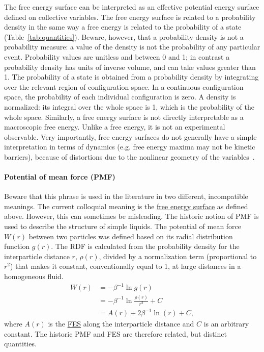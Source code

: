 \documentclass[9pt,review]{livecoms}
\begin{document}
The free energy surface can be interpreted as an effective potential energy surface defined on collective variables.
The free energy surface is related to a probability density in the same way a free energy is related to the probability of a state (Table~\ref{tab:quantities}).
Beware, however, that a probability density is not a probability measure: a value of the density is not the probability of any particular event.
Probability values are unitless and between 0 and 1; in contrast a probability density has units of inverse volume, and can take values greater than 1. The probability of a state is obtained from a probability density by integrating over the relevant region of configuration space. In a continuous configuration space, the probability of each individual configuration is zero.
A density is normalized: its integral over the whole space is 1, which is the probability of the whole space.
Similarly, a free energy surface is not directly interpretable as a macroscopic free energy. Unlike a free energy, it is not an experimental observable.
Very importantly, free energy surfaces do not generally have a simple interpretation in terms of dynamics (e.g. free energy maxima may not be kinetic barriers), because of distortions due to the nonlinear geometry of the variables~\cite{10.1063/5.0020240,Dietschreit2022}.


\hypertarget{ref:PMF} {\paragraph{Potential of mean force (PMF)}}
Beware that this phrase is used in the literature in two different, incompatible meanings. The current colloquial meaning is the \hyperlink{ref:FES} {free energy surface} as defined above.  However, this can sometimes be misleading. The historic notion of PMF is used to describe the structure of simple liquids.
The potential of mean force $W(r)$ between two particles was defined based on its radial distribution function $g(r)$. The RDF is calculated from the probability density for the interparticle distance $r$, $\rho(r)$, divided by a normalization term (proportional to $r^2$) that makes it constant, conventionally equal to 1, at large distances in a homogeneous fluid.
\begin{align}
    W(r) &= -\beta^{-1} \ln g(r) \nonumber \\
    &= -\beta^{-1} \ln \frac{\rho(r)}{r^2} + C  \nonumber \\
    &= A(r) + 2 \beta^{-1} \ln(r) + C,
    \label{eq:pmf_fes}
\end{align}
where $A(r)$ is the \hyperlink{ref:FES} {FES} along the interparticle distance and $C$ is an arbitrary constant.
The historic PMF and FES are therefore related, but distinct quantities.
\end{document}
